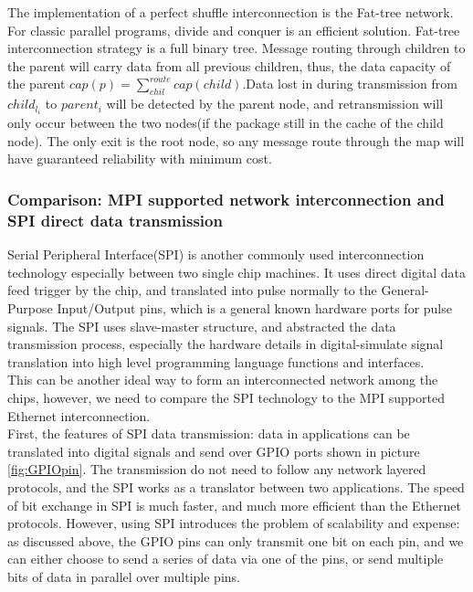 \documentclass[11pt,openright,a4paper]{report}
\begin{document}
The implementation of a perfect shuffle interconnection is the Fat-tree network. For classic parallel programs, divide and conquer is an efficient solution\cite{aho1974design}. Fat-tree interconnection strategy is a full binary tree. Message routing through children to the parent will carry data from all previous children, thus, the data capacity of the parent $cap(p)=\sum_{chil}^{route}cap(child)$.Data lost in during transmission from $child_{l_{i}}$ to $parent_{i}$ will be detected by the parent node, and retransmission will only occur between the two nodes(if the package still in the cache of the child node). The only exit is the root node, so any message route through the map will have guaranteed reliability with minimum cost.

\subsubsection{Comparison: MPI supported network interconnection and SPI direct data transmission}
Serial Peripheral Interface(SPI) is another commonly used interconnection technology especially between two single chip machines\cite{junger2007method}. It uses direct digital data feed trigger by the chip, and translated into pulse normally to the General-Purpose Input/Output pins, which is a general known hardware ports for pulse signals\cite{lin2008transmission}. The SPI uses slave-master structure, and abstracted the data transmission process, especially the hardware details in digital-simulate signal translation into high level programming language functions and interfaces.\\
This can be another ideal way to form an interconnected network among the chips, however, we need to compare the SPI technology to the MPI supported Ethernet interconnection.\\
First, the features of SPI data transmission: data in applications can be translated into digital signals and send over GPIO ports shown in picture \ref{fig:GPIOpin}. The transmission do not need to follow any network layered protocols, and the SPI works as a translator between two applications. The speed of bit exchange in SPI is much faster, and much more efficient than the Ethernet protocols. However, using SPI introduces the problem of scalability and expense: as discussed above, the GPIO pins can only transmit one bit on each pin, and we can either choose to send a series of data via one of the pins, or send multiple bits of data in parallel over multiple pins.\\
\end{document}

